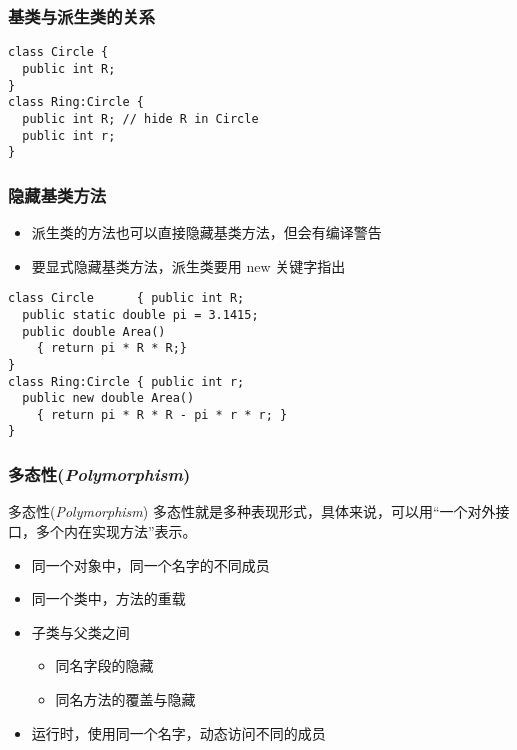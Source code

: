 \begin{frame}[fragile]
\frametitle{基类与派生类的关系}
\begin{lstlisting}[escapeinside=<>]
class Circle {
  public int R;
}
class Ring:Circle {
  public int R; // hide R in Circle
  public int r;
}
\end{lstlisting}
\end{frame}

\begin{frame}[fragile]
\frametitle{隐藏基类方法}
\begin{itemize}
\item 派生类的方法也可以直接隐藏基类方法，但会有编译警告
\item 要显式隐藏基类方法，派生类要用 new 关键字指出
\end{itemize}
\begin{lstlisting}
class Circle      { public int R;
  public static double pi = 3.1415;
  public double Area()
    { return pi * R * R;}
}
class Ring:Circle { public int r;
  public new double Area()
    { return pi * R * R - pi * r * r; }
}
\end{lstlisting}

\end{frame}

\begin{frame}
\frametitle{多态性(\textit{Polymorphism})}

\begin{block}{多态性(\textit{Polymorphism})}
  \CJKindent 多态性就是多种表现形式，具体来说，可以用“一个对外接口，多个内在实现方法”表示。
\end{block}

  \begin{itemize}
    \setlength{\itemsep}{8pt plus 1pt}
  \item 同一个对象中，同一个名字的不同成员
  \item 同一个类中，方法的重载
  \item 子类与父类之间
    \begin{itemize}
    \item 同名字段的隐藏
    \item 同名方法的覆盖与隐藏
    \end{itemize}
  \item 运行时，使用同一个名字，动态访问不同的成员
  \end{itemize}
\end{frame}

